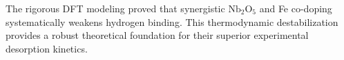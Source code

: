 \documentclass[12pt,a4paper]{article}
\begin{document}
The rigorous DFT modeling proved that synergistic $\text{Nb}_2\text{O}_5$ and Fe co-doping systematically weakens hydrogen binding. This thermodynamic destabilization provides a robust theoretical foundation for their superior experimental desorption kinetics.



\end{document}
